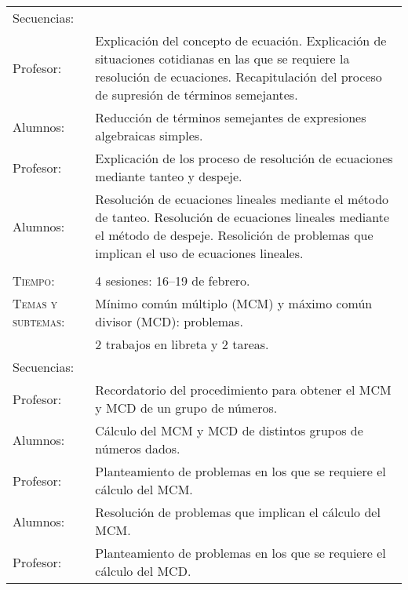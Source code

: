 \documentclass[letterpaper,10pt]{article}
\begin{document}
\begin{tabular}[t]{R{0.25\textwidth}p{0.71\textwidth}}
    \large{\sc Secuencias:} \\
    
    Profesor:    & Explicaci\'on del concepto de ecuaci\'on. Explicaci\'on de 
    situaciones cotidianas en las que se requiere la resoluci\'on de ecuaciones.
    Recapitulaci\'on del proceso de supresi\'on de t\'erminos semejantes. \\
    
    Alumnos:    & Reducci\'on de t\'erminos semejantes de expresiones 
    algebraicas simples.\\
    
    Profesor:   & Explicaci\'on de los proceso de resoluci\'on de ecuaciones 
    mediante tanteo y despeje. \\
    
    Alumnos:    & Resoluci\'on de ecuaciones lineales mediante el m\'etodo de
    tanteo. Resoluci\'on de ecuaciones lineales mediante el m\'etodo de 
    despeje. Resolici\'on de problemas que implican el uso de ecuaciones 
    lineales.
\\ \hline \\
    \textsc{Tiempo:}           & 4 sesiones: 16--19  de febrero. \\
    \textsc{Temas y subtemas:} & M\'inimo com\'un m\'ultiplo (MCM) y m\'aximo com\'un 
    divisor (MCD): problemas. \\
     & 2 trabajos en libreta y 2 tareas. \\
    \large{\sc Secuencias:} \\
    
    Profesor:    & Recordatorio del procedimiento para obtener el MCM y MCD de 
    un grupo de n\'umeros. \\
    
    Alumnos:     & C\'alculo del MCM y MCD de distintos grupos de n\'umeros 
    dados. \\
    
    Profesor:   & Planteamiento de problemas en los que se requiere el c\'alculo 
    del MCM. \\
    
    Alumnos:    & Resoluci\'on de problemas que implican el c\'alculo del MCM. \\
    
    Profesor:   & Planteamiento de problemas en los que se requiere el c\'alculo 
    del MCD. \\
    

\end{tabular}
\end{document}

